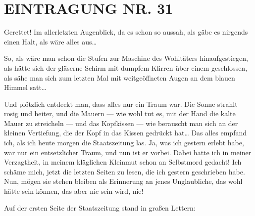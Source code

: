 \section{EINTRAGUNG NR. 31}

Gerettet! Im allerletzten Augenblick, da es schon so aussah, als
gäbe es nirgends einen Halt, als wäre alles aus\ldots{}

So, als wäre man
schon die Stufen zur Maschine des Wohltäters hinaufgestiegen, als
hätte sich der gläserne Schirm mit dumpfem Klirren über einem
geschlossen, als sähe man sich zum letzten Mal mit weitgeöffneten
Augen an dem blauen Himmel satt\ldots{}

Und plötzlich entdeckt man, dass alles nur ein Traum war. Die Sonne
strahlt rosig und heiter, und die Mauern — wie wohl tut es, mit der
Hand die kalte Mauer zu streicheln — und das Kopfkissen — wie
berauscht man sich an der kleinen Vertiefung, die der Kopf in das
Kissen gedrückt hat\ldots{} Das alles empfand ich, als ich heute morgen
die Staatszeitung las. Ja, was ich gestern erlebt habe, war nur ein
entsetzlicher Traum, und nun ist er vorbei. Dabei hatte ich in
meiner Verzagtheit, in meinem kläglichen Kleinmut schon an
Selbstmord gedacht! Ich schäme mich, jetzt die letzten Seiten zu
lesen, die ich gestern geschrieben habe. Nun, mögen sie stehen
bleiben als Erinnerung an jenes Unglaubliche, das wohl hätte sein
können, das aber nie sein wird, nie!

Auf der ersten Seite der Staatszeitung stand in großen Lettern:

